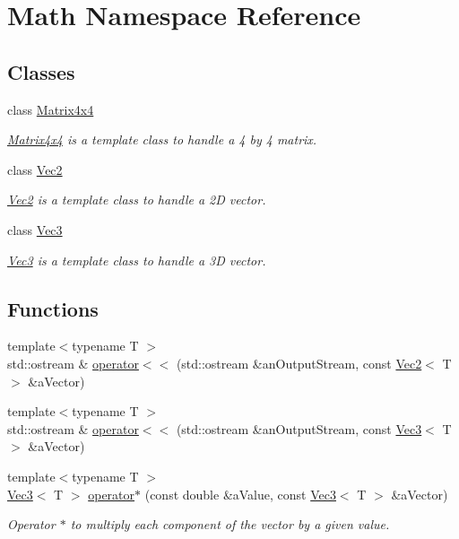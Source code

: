 \hypertarget{namespace_math}{
\section{Math Namespace Reference}
\label{namespace_math}
}
\subsection*{Classes}
\begin{DoxyCompactItemize}
\item 
class \hyperlink{class_math_1_1_matrix4x4}{Matrix4x4}
\begin{DoxyCompactList}\small\item\em \hyperlink{class_math_1_1_matrix4x4}{Matrix4x4} is a template class to handle a 4 by 4 matrix. \end{DoxyCompactList}\item 
class \hyperlink{class_math_1_1_vec2}{Vec2}
\begin{DoxyCompactList}\small\item\em \hyperlink{class_math_1_1_vec2}{Vec2} is a template class to handle a 2D vector. \end{DoxyCompactList}\item 
class \hyperlink{class_math_1_1_vec3}{Vec3}
\begin{DoxyCompactList}\small\item\em \hyperlink{class_math_1_1_vec3}{Vec3} is a template class to handle a 3D vector. \end{DoxyCompactList}\end{DoxyCompactItemize}
\subsection*{Functions}
\begin{DoxyCompactItemize}
\item 
{\footnotesize template$<$typename T $>$ }\\std::ostream \& \hyperlink{namespace_math_ae50cf02c21b5ac0d5823b4c241a78e4a}{operator$<$$<$} (std::ostream \&anOutputStream, const \hyperlink{class_math_1_1_vec2}{Vec2}$<$ T $>$ \&aVector)
\item 
{\footnotesize template$<$typename T $>$ }\\std::ostream \& \hyperlink{namespace_math_acc900aa9a1fb3f647f5376f3ef9fd394}{operator$<$$<$} (std::ostream \&anOutputStream, const \hyperlink{class_math_1_1_vec3}{Vec3}$<$ T $>$ \&aVector)
\item 
{\footnotesize template$<$typename T $>$ }\\\hyperlink{class_math_1_1_vec3}{Vec3}$<$ T $>$ \hyperlink{namespace_math_a70ac0d0292ad4baeaf81e8a0bfe92173}{operator$\ast$} (const double \&aValue, const \hyperlink{class_math_1_1_vec3}{Vec3}$<$ T $>$ \&aVector)
\begin{DoxyCompactList}\small\item\em Operator $\ast$ to multiply each component of the vector by a given value. \end{DoxyCompactList}\end{DoxyCompactItemize}


